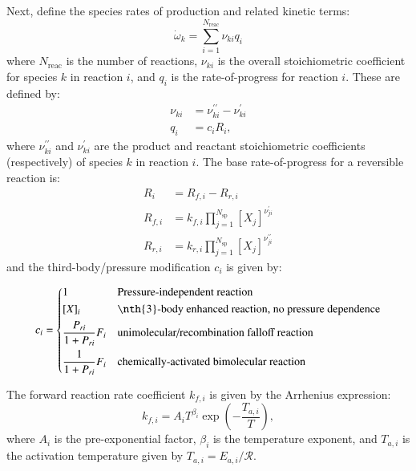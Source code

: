 \documentclass[preprint,12pt]{elsarticle}
\begin{document}
Next, define the species rates of production and related kinetic terms:
\begin{equation}
\dot{\omega}_k = \sum_{i=1}^{N_{\text{reac}}} \nu_{k i} q_i
\end{equation}
where $N_{\text{reac}}$ is the number of reactions, $\nu_{k i}$ is the overall stoichiometric coefficient for species $k$ in reaction $i$, and $q_i$ is the rate-of-progress for reaction $i$.
These are defined by:
\begin{align}
\nu_{k i} &= \nu_{k i}^{\prime \prime} - \nu_{k i}^{\prime}  \\
q_i &= c_i R_i ,
\end{align}
where $\nu_{k i}^{\prime \prime}$ and $\nu_{k i}^{\prime}$ are the product and reactant stoichiometric coefficients (respectively) of species $k$ in reaction $i$.
The base rate-of-progress for a reversible reaction is:
\begin{align}
R_i &= R_{f, i} - R_{r, i} \\
R_{f, i} &= k_{f, i} \prod_{j = 1}^{N_{\text{sp}}} [X_j]^{\nu_{j i}^{\prime}} \\
R_{r, i} &= k_{r, i} \prod_{j = 1}^{N_{\text{sp}}} [X_j]^{\nu_{j i}^{\prime \prime}}
\end{align}
and the third-body\slash pressure modification $c_i$ is given by:

\begin{equation}
c_i = \begin{dcases}
  1 &\text{Pressure-independent reaction} \\
  [X]_i &\text{\nth{3}-body enhanced reaction, no pressure dependence} \\
  \frac{P_{r i}}{1 + P_{r i}} F_i &\text{unimolecular/recombination falloff reaction} \\
  \frac{1}{1 + P_{r i}} F_i &\text{chemically-activated bimolecular reaction}
  \end{dcases}
\label{e:rxn_pressure}
\end{equation}

The forward reaction rate coefficient $k_{f, i}$ is given by the Arrhenius expression:
\begin{equation}
\label{e:arrhenius}
  k_{f, i} = A_i T^{\beta_i} \exp \left( - \frac{T_{a, i}}{T} \right),
\end{equation}
where $A_i$ is the pre-exponential factor, $\beta_i$ is the temperature exponent, and $T_{a, i}$ is the activation temperature given by $T_{a, i} = E_{a, i} / \mathcal{R}$.
\end{document}
